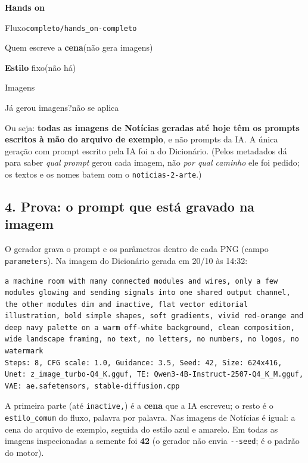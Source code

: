 \begin{recordbox}
{\bfseries\color{accent} Hands on}\par
{\small\color{muted} Fluxo}\quad \nolinkurl{completo/hands_on-completo}\par
{\small\color{muted} Quem escreve a \textbf{cena}}\quad (não gera imagens)\par
{\small\color{muted} \textbf{Estilo} fixo}\quad (não há)\par
{\small\color{muted} Imagens}\par
{\small\color{muted} Já gerou imagens?}\quad não se aplica\par
\end{recordbox}


Ou seja: \textbf{todas as imagens de Notícias geradas até hoje têm os prompts escritos à mão do arquivo de exemplo}, e não prompts da IA. A única geração com prompt escrito pela IA foi a do Dicionário. (Pelos metadados dá para saber \emph{qual prompt} gerou cada imagem, não \emph{por qual caminho} ele foi pedido; os textos e os nomes batem com o \nolinkurl{noticias-2-arte}.)

\subsection*{4. Prova: o prompt que está gravado na imagem}

O gerador grava o prompt e os parâmetros dentro de cada PNG (campo \texttt{parameters}). Na imagem do Dicionário gerada em 20/10 às 14:32:

\begin{lstlisting}
a machine room with many connected modules and wires, only a few modules glowing and sending signals into one shared output channel, the other modules dim and inactive, flat vector editorial illustration, bold simple shapes, soft gradients, vivid red-orange and deep navy palette on a warm off-white background, clean composition, wide landscape framing, no text, no letters, no numbers, no logos, no watermark
Steps: 8, CFG scale: 1.0, Guidance: 3.5, Seed: 42, Size: 624x416, Unet: z_image_turbo-Q4_K.gguf, TE: Qwen3-4B-Instruct-2507-Q4_K_M.gguf, VAE: ae.safetensors, stable-diffusion.cpp
\end{lstlisting}

A primeira parte (até \texttt{inactive,}) é a \textbf{cena} que a IA escreveu; o resto é o \nolinkurl{estilo_comum} do fluxo, palavra por palavra. Nas imagens de Notícias é igual: a cena do arquivo de exemplo, seguida do estilo azul e amarelo. Em todas as imagens inspecionadas a semente foi \textbf{42} (o gerador não envia \nolinkurl{--seed}; é o padrão do motor).

